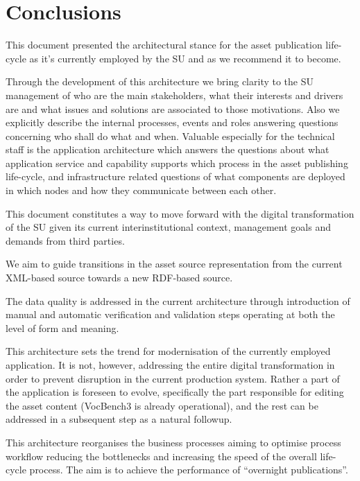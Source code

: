 \chapter{Conclusions}
\label{sec:conclusions}
	
	This document presented the architectural stance for the asset publication life-cycle as it's currently employed by the SU and as we recommend it to become.
	
	Through the development of this architecture we bring clarity to the SU management of who are the main stakeholders, what their interests and drivers are and what issues and solutions are associated to those motivations. Also we explicitly describe the internal processes, events and roles answering questions concerning who shall do what and when. Valuable especially for the technical staff is the application architecture which answers the questions about what application service and capability supports which process in the asset publishing life-cycle, and infrastructure related questions of what components are deployed in which nodes and how they communicate between each other. 
	
	This document constitutes a way to move forward with the digital transformation of the SU given its current interinstitutional context, management goals and demands from third parties.
	
	We aim to guide transitions in the asset source representation from the current XML-based source towards a new RDF-based source. 
	
    The data quality is addressed in the current architecture through introduction of manual and automatic verification and validation steps operating at both the level of form and meaning.
    
    This architecture sets the trend for modernisation of the currently employed application. It is not, however, addressing the entire digital transformation in order to prevent disruption in the current production system. Rather a part of the application is foreseen to evolve, specifically the part responsible for editing the asset content (VocBench3 is already operational), and the rest can be addressed in a subsequent step as a natural followup. 
	
	This architecture reorganises the business processes aiming to optimise process workflow reducing the bottlenecks and increasing the speed of the overall life-cycle process. The aim is to achieve the performance of ``overnight publications''. 

